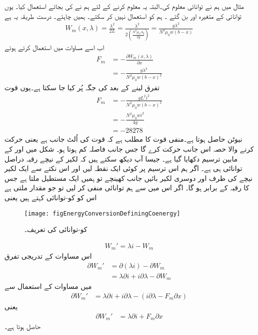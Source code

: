 مثال  میں ہم نے توانائی معلوم کی۔البتہ یہ معلوم کرنے  کے لئے ہم نے  کی  بجائے  استعمال کیا۔ یوں  توانائی کے متغیرہ   اور  بن گئے ۔  ہم  کو استعمال نہیں کر سکتے۔ ہمیں  چاہئے۔ درست طریقہ یہ ہے
\begin{align*}
W_m(x,\lambda)=\frac{\lambda^2}{2 L}=\frac{\lambda^2}{2 \left(\frac{N^2 \mu_0 A_g}{2 g} \right)}=\frac{ g \lambda^2}{N^2 \mu_0 w (b-x)}
\end{align*}
اب اسے مساوات  میں استعمال کرتے ہوئے
\begin{align*}
F_m&=-\frac{\partial W_m(x,\lambda)}{\partial x}\\
&=-\frac{g \lambda^2}{N^2 \mu_0 w (b-x)^2}
\end{align*}
تفرق لینے کے بعد  کی جگہ  پُر کیا جا سکتا ہے۔یوں قوت
\begin{align*}
F_m&=-\frac{g L^2 i^2}{N^2 \mu_0 w (b-x)^2}\\
&=-\frac{N^2 \mu_0 w i^2}{4 g}\\
&=\num{-28278}
\end{align*}
نیوٹن حاصل ہوتا ہے۔منفی قوت کا مطلب ہے کہ قوت  کی اُلٹ جانب ہے یعنی حرکت کرنے والا حصہ اس جانب حرکت کرے گا جس جانب فاصلہ کم ہوتا ہو۔
%
	شکل   میں  اور  کے مابین ترسیم دکھایا گیا ہے۔ جیسا آپ دیکھ سکتے ہیں کہ لکیر کے نیچے رقبہ دراصل توانائی ہی ہے۔ اگر ہم اس ترسیم پر کوئی ایک نقطہ  لیں اور اس نکتے سے ایک لکیر نیچے کی طرف اور دوسری لکیر بائیں جانب کھینچے تو ہمیں ایک مستطیل ملتا ہے جس کا رقبہ  کے برابر ہو گا۔ اگر اس میں سے ہم توانائی   منفی کر لیں تو جو مقدار ملتی ہے اس کو کو-توانائی  کہتے ہیں یعنی
\begin{figure}
\centering
\texttt{[image: figEnergyConversionDefiningCoenergy]}
\caption{کو-توانائی کی تعریف۔}
\label{شکل_تبادلہ_توانائی_کو_توانائی_کی_تعریف}
\end{figure}

\begin{align}
W_m'=\lambda i -W_m
\end{align}
اس مساوات کے تدریجی تفرق
\begin{align*}
\partial W_m'&=\partial (\lambda i) -\partial W_m\\
&=\lambda \partial i + i \partial \lambda -\partial W_m
\end{align*}
میں مساوات   کے استعمال سے
\begin{align*}
\partial W_m'&=\lambda \partial i + i \partial \lambda -(i \partial \lambda-F_m \partial x)
\end{align*}
یعنی
\begin{align}\label{مساوات_تبادلہ_کو_توانائی_تعریفی_مساوات}
\partial W_m'&=\lambda \partial i + F_m \partial x
\end{align}
حاصل ہوتا ہے۔

